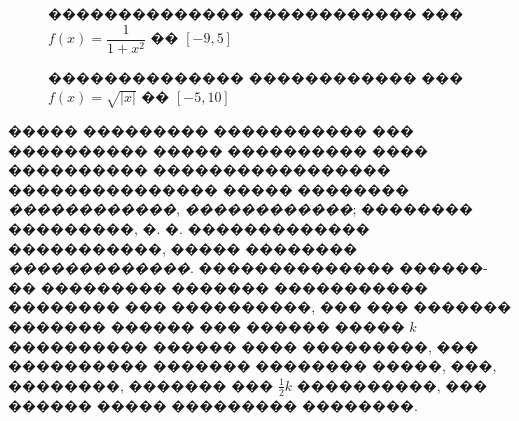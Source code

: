 \documentclass[a4paper]{article}
\begin{document}
\begin{figure}[tbh]
  \noindent{}
  \caption{�������������� ������������ ��� $f(x)=\dfrac{1}{1+x^2}$ �� $[-9,5]$}
  \label{runge1}
\end{figure}
\begin{figure}[tbh]
  \noindent{}
  \caption{�������������� ������������ ��� $f(x)=\sqrt{|x|}$ �� $[-5,10]$}
  \label{runge2}
\end{figure}

����� ��������� ����������� ��� ���������� ����� ���������� ���� ���������� ����������������� ��������������� ����� �������� {\it ������������}, {\it ������������}; �������� ���������, �. �. ������������� �����������, ����� �������� {\it�������������}.
�������������� ������-�� ��������� ������� ����������� �������� ��� ����������,
��� ��� ������� ������� ������ ��� ������ ����� $k$ ���������� ������ ���� ���������,
��� ���������� ������� �������� �����, ���, ��������, ������� ��� $\frac{1}{2}k$ ����������, ��� ������ ����� ��������� ��������.
\end{document}
